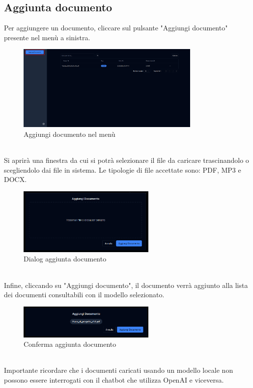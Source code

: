 \subsection{Aggiunta documento}
Per aggiungere un documento, cliccare sul pulsante "Aggiungi documento" presente nel menù a sinistra.
\begin{figure}[h!]
    \centering
    \includegraphics[width=0.8\textwidth]{schermatadocaggiungi.png}
    \caption{Aggiungi documento nel menù}\label{fig:adddocs}
\end{figure}
\\Si aprirà una finestra da cui si potrà selezionare il file da caricare trascinandolo o scegliendolo dai file in sistema. Le tipologie di file accettate sono: PDF, MP3 e DOCX.
\begin{figure}[h!]
    \centering
    \includegraphics[width=0.6\textwidth]{dialogadd.png}
    \caption{Dialog aggiunta documento}\label{fig:dialogadd}
\end{figure}
\\Infine, cliccando su "Aggiungi documento", il documento verrà aggiunto alla lista dei documenti consultabili con il modello selezionato.
\begin{figure}[h!]
    \centering
    \includegraphics[width=0.6\textwidth]{docadd.png}
    \caption{Conferma aggiunta documento}\label{fig:confirmadd}
\end{figure}
\\Importante ricordare che i documenti caricati usando un modello locale non possono essere interrogati con il chatbot che utilizza OpenAI e viceversa.
